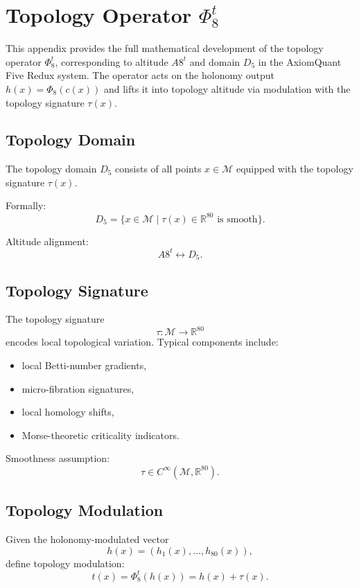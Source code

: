 \section{Topology Operator \texorpdfstring{$\Phi_8^t$}{Phi8t}}
\label{sec:topology}

This appendix provides the full mathematical development of the topology
operator $\Phi_8^t$, corresponding to altitude $A8^t$ and domain $D_5$ in the
AxiomQuant Five Redux system. The operator acts on the holonomy output
$h(x) = \Phi_8(c(x))$ and lifts it into topology altitude via modulation with
the topology signature $\tau(x)$.

\subsection{Topology Domain}

The topology domain $D_5$ consists of all points $x \in \mathcal{M}$ equipped
with the topology signature $\tau(x)$.

Formally:
\[
D_5 = \{ x \in \mathcal{M} \mid \tau(x) \in \mathbb{R}^{80} \text{ is smooth} \}.
\]

Altitude alignment:
\[
A8^t \leftrightarrow D_5.
\]

\subsection{Topology Signature}

The topology signature
\[
\tau : \mathcal{M} \to \mathbb{R}^{80}
\]
encodes local topological variation. Typical components include:

\begin{itemize}
    \item local Betti-number gradients,
    \item micro-fibration signatures,
    \item local homology shifts,
    \item Morse-theoretic criticality indicators.
\end{itemize}

Smoothness assumption:
\[
\tau \in C^\infty(\mathcal{M}, \mathbb{R}^{80}).
\]

\subsection{Topology Modulation}

Given the holonomy-modulated vector
\[
h(x) = (h_1(x), \dots, h_{80}(x)),
\]
define topology modulation:
\[
t(x) = \Phi_8^t(h(x)) = h(x) + \tau(x).
\]


